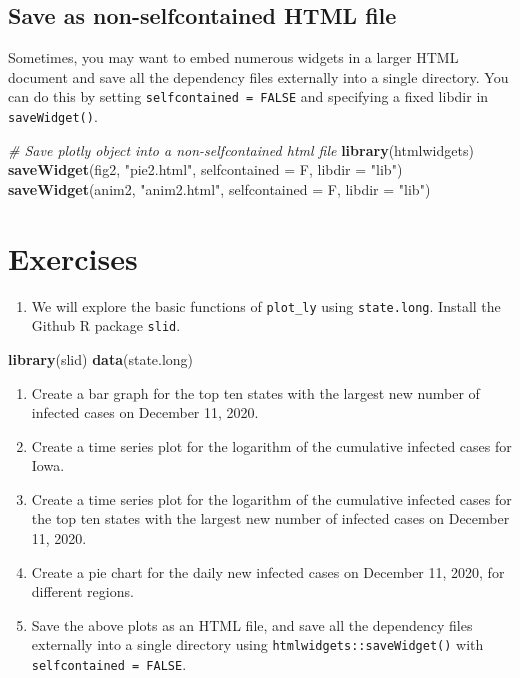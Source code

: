 \documentclass[]{book}
\newenvironment{Shaded}{\begin{snugshade}}{\end{snugshade}}
\newcommand{\KeywordTok}[1]{\textcolor[rgb]{0.13,0.29,0.53}{\textbf{#1}}}
\newcommand{\DataTypeTok}[1]{\textcolor[rgb]{0.13,0.29,0.53}{#1}}
\newcommand{\StringTok}[1]{\textcolor[rgb]{0.31,0.60,0.02}{#1}}
\newcommand{\CommentTok}[1]{\textcolor[rgb]{0.56,0.35,0.01}{\textit{#1}}}
\newcommand{\NormalTok}[1]{#1}
\providecommand{\tightlist}{%
  \setlength{\itemsep}{0pt}\setlength{\parskip}{0pt}}
\begin{document}
\subsection{Save as non-selfcontained HTML
file}\label{save-as-non-selfcontained-html-file}

Sometimes, you may want to embed numerous widgets in a larger HTML
document and save all the dependency files externally into a single
directory. You can do this by setting \texttt{selfcontained\ =\ FALSE}
and specifying a fixed libdir in \texttt{saveWidget()}.

\begin{Shaded}
\begin{Highlighting}[]
\CommentTok{# Save plotly object into a non-selfcontained html file}
\KeywordTok{library}\NormalTok{(htmlwidgets)}
\KeywordTok{saveWidget}\NormalTok{(fig2, }\StringTok{"pie2.html"}\NormalTok{, }\DataTypeTok{selfcontained =}\NormalTok{ F, }\DataTypeTok{libdir =} \StringTok{"lib"}\NormalTok{)}
\KeywordTok{saveWidget}\NormalTok{(anim2, }\StringTok{"anim2.html"}\NormalTok{, }\DataTypeTok{selfcontained =}\NormalTok{ F, }\DataTypeTok{libdir =} \StringTok{"lib"}\NormalTok{)}
\end{Highlighting}
\end{Shaded}

\section{Exercises}\label{exercises-2}

\begin{enumerate}
\def\labelenumi{\arabic{enumi}.}
\tightlist
\item
  We will explore the basic functions of \texttt{plot\_ly} using
  \texttt{state.long}. Install the Github R package \texttt{slid}.
\end{enumerate}

\begin{Shaded}
\begin{Highlighting}[]
\KeywordTok{library}\NormalTok{(slid)}
\KeywordTok{data}\NormalTok{(state.long)}
\end{Highlighting}
\end{Shaded}

\begin{enumerate}
\def\labelenumi{\alph{enumi}.}
\item
  Create a bar graph for the top ten states with the largest new number
  of infected cases on December 11, 2020.
\item
  Create a time series plot for the logarithm of the cumulative infected
  cases for Iowa.
\item
  Create a time series plot for the logarithm of the cumulative infected
  cases for the top ten states with the largest new number of infected
  cases on December 11, 2020.
\item
  Create a pie chart for the daily new infected cases on December 11,
  2020, for different regions.
\item
  Save the above plots as an HTML file, and save all the dependency
  files externally into a single directory using
  \texttt{htmlwidgets::saveWidget()} with
  \texttt{selfcontained\ =\ FALSE}.
\end{enumerate}
\end{document}
